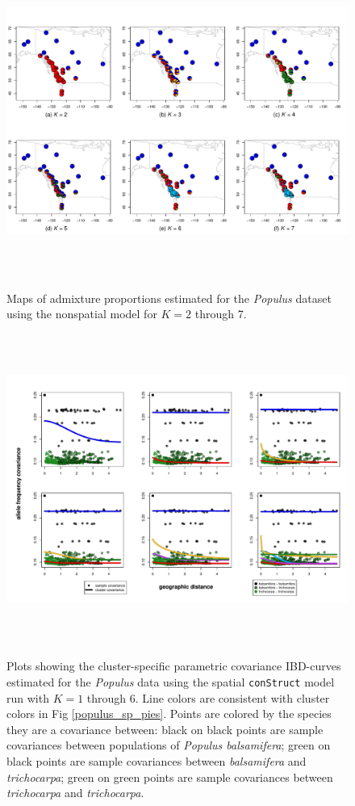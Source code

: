 \documentclass[12pt]{article}
\newcommand{\tri}{\textit{trichocarpa}}
\newcommand{\bals}{\textit{balsamifera}}
\begin{document}
\begin{figure}
	\centering
		{\includegraphics[width=6in,height=4in]{figs/populus/populus_nsp_pies.pdf}}
	\caption{
	Maps of admixture proportions estimated for the \textit{Populus} dataset 
	using the nonspatial model for $K=2$ through 7.
    }\label{populus_nsp_pies}
\end{figure}

\begin{figure}
	\centering
		{\includegraphics[width=6in,height=4in]{figs/populus/populus_sp_clst_covs.pdf}}
	\caption{
	Plots showing the cluster-specific parametric covariance IBD-curves 
	estimated for the \textit{Populus} data using 
	the spatial \texttt{conStruct} model run with $K=1$ through 6.
	Line colors are consistent with cluster colors in Fig \ref{populus_sp_pies}.
	Points are colored by the species they are a covariance between:
	black on black points are sample covariances between populations of \textit{Populus balsamifera};
	green on black points are sample covariances between \bals{} and \tri{};
	green on green points are sample covariances between \tri{} and \tri{}.
    }\label{populus_sp_clst_covs}
\end{figure}
\end{document}
